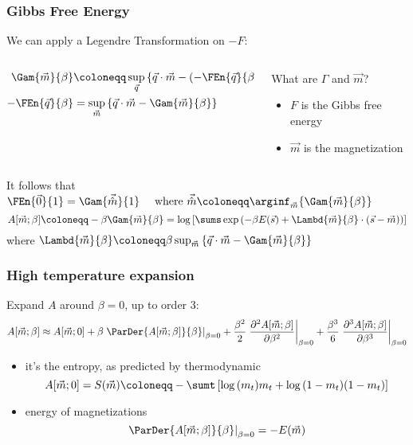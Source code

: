 \begin{frame}
  \frametitle{Gibbs Free Energy}
  We can apply a Legendre Transformation on \(-F\):
  \begin{columns}
    \begin{column}{0.5\textwidth}
      \begin{align*}
        \Gam{\vec{m}}{\beta} &\coloneqq \sup_{\vec{q}}{\left\{\vec{q}\cdot\vec{m}
          - \left(-\FEn{\vec{q}}{\beta}\right)\right\}}\\
        -\FEn{\vec{q}}{\beta}& = \sup_{\vec{m}}{\left\{\vec{q}\cdot\vec{m} - \Gam{\vec{m}}{\beta}\right\}}
      \end{align*}
    \end{column}
    \begin{column}{0.40\textwidth}
      \begin{alertblock}{What are \(\Gamma\) and \(\vec{m}\)?}
        \begin{itemize}
          \item \(F\) is the Gibbs free energy
          \item \(\vec{m}\) is the magnetization
        \end{itemize}
      \end{alertblock}
    \end{column}
    
  \end{columns}
  \vspace{20pt}
  It follows that
  \(
    \FEn{\vec{0}}{1} = \Gam{\vec{\hat{m}}}{1} \quad 
    \text{ where } \vec{\hat{m}} \coloneqq \arginf_{\vec{m}}{\left\{\Gam{\vec{m}}{\beta}\right\}}
  \)
  \[
    A{\left[\vec{m};\beta\right]} \coloneqq -\beta \Gam{\vec{m}}{\beta} =
    \log{\left[\sums\exp{\left(-\beta E(\vec{s}) +     
        \Lambd{\vec{m}}{\beta}\cdot(\vec{s}-\vec{m})\right)}\right]}
  \]
  where \(\Lambd{\vec{m}}{\beta} \coloneqq \beta \sup_{\vec{m}}{\left\{\vec{q}\cdot\vec{m} - \Gam{\vec{m}}{\beta}\right\}}\)
\end{frame}

\begin{frame}
  \frametitle{High temperature expansion}
  Expand \(A\) around \(\beta = 0\), up to order 3:
  \[
  A{\left[\vec{m};\beta\right]} \approx
  A{\left[\vec{m};0\right]} + 
  \beta \left.\ParDer{A{\left[\vec{m};\beta\right]}}{\beta}\right|_{\beta=0} +
  \frac{\beta^2}{2}
  \left.\frac{\partial^2A{\left[\vec{m};\beta\right]}}{\partial\beta^2}\right|_{\beta=0}+
  \frac{\beta^3}{6} 
  \left.\frac{\partial^3A{\left[\vec{m};\beta\right]}}{\partial\beta^3}\right|_{\beta=0}    
  \]
  \begin{itemize}
    \item {} it's the entropy, as predicted by thermodynamic
    \[
      A{\left[\vec{m};0\right]} = S{\left(\vec{m}\right)} \coloneqq -\sumt\left[\log{\left(m_t\right)}m_t + \log{\left(1-m_t\right)}(1-m_t)\right]
     \]
    \item {} energy of magnetizations
    \[
      \left.\ParDer{A{\left[\vec{m};\beta\right]}}{\beta}\right|_{\beta=0}
      = -E{(\vec{m})}
    \]
  \end{itemize}
\end{frame}

